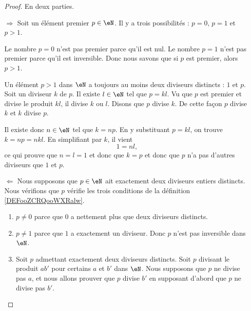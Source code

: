 \begin{proof}
    En deux parties.
    \begin{subproof}
    \item[\( \Rightarrow\)]
        Soit un élément premier \( p\in \eN\). Il y a trois possibilités : \( p=0\), \( p=1\) et \( p>1\).

    Le nombre \( p=0\) n'est pas premier parce qu'il est nul. Le nombre \( p=1\) n'est pas premier parce qu'il est inversible. Donc nous savons que si \( p\) est premier, alors \( p>1\).

    Un élément \( p>1\) dans \( \eN\) a toujours au moins deux diviseurs distincts : \( 1\) et \( p\). Soit un diviseur \( k\) de \( p\). Il existe \( l\in \eN\) tel que \( p=kl\). Vu que \( p\) est premier et divise le produit \( kl\), il divise \( k\) ou \( l\). Disons que \( p\) divise \( k\). De cette façon \( p\) divise \( k\) et \( k\) divise \( p\).

    Il existe donc \( n\in \eN\) tel que \( k=np\). En y substituant \( p=kl\), on trouve \( k=np=nkl\). En simplifiant par \( k\), il vient
    \begin{equation}
        1=nl,
    \end{equation}
    ce qui prouve que \( n=l=1\) et donc que \( k=p\) et donc que \( p\) n'a pas d'autres diviseurs que \( 1\) et \( p\).
        
    \item[\( \Leftarrow\)]
        Nous supposons que \( p\in \eN\) ait exactement deux diviseurs entiers distincts. Nous vérifions que \( p\) vérifie les trois conditions de la définition \ref{DEFooZCRQooWXRalw}.

        \begin{enumerate}
            \item
                \( p\neq 0\) parce que \( 0\) a nettement plus que deux diviseurs distincts.
            \item
                \( p\neq 1\) parce que \( 1\) a exactement un diviseur. Donc \( p\) n'est pas inversible dans \( \eN\).
            \item
                Soit \( p\) admettant exactement deux diviseurs distincts. Soit \( p\) divisant le produit \( ab'\) pour certains \( a\) et \( b'\) dans \( \eN\). Nous supposons que \( p\) ne divise pas \( a\), et nous allons prouver que \( p\) divise \( b'\) en supposant d'abord que \( p\) ne divise pas \( b'\). 


\end{enumerate}
\end{subproof}
\end{proof}
